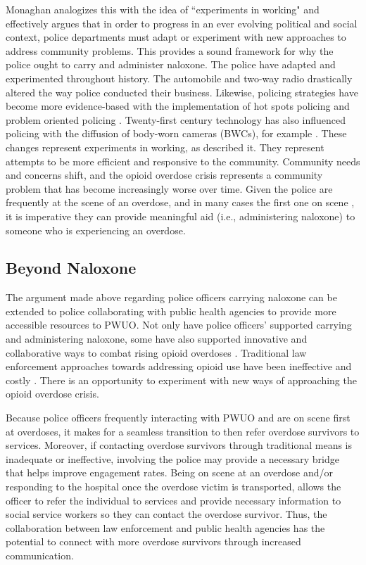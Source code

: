 Monaghan analogizes this with the idea of ``experiments in working" and effectively argues that in order to progress in an ever evolving political and social context, police departments must adapt or experiment with new approaches to address community problems. This provides a sound framework for why the police ought to carry and administer naloxone. The police have adapted and experimented throughout history. The automobile and two-way radio drastically altered the way police conducted their business. Likewise, policing strategies have become more evidence-based with the implementation of hot spots policing and problem oriented policing \parencite{braga_hot_2019, hinkle_problemoriented_2020}. Twenty-first century technology has also influenced policing with the diffusion of body-worn cameras (BWCs), for example \parencite{white_cops_2020}. These changes represent experiments in working, as \textcite{monaghan_broken_2022} described it. They represent attempts to be more efficient and responsive to the community. Community needs and concerns shift, and the opioid overdose crisis represents a community problem that has become increasingly worse over time. Given the police are frequently at the scene of an overdose, and in many cases the first one on scene \parencite{pourtaher_naloxone_2022, white_leveraging_2022}, it is imperative they can provide meaningful aid (i.e., administering naloxone) to someone who is experiencing an overdose. 

\subsection{Beyond Naloxone}

The argument made above regarding police officers carrying naloxone can be extended to police collaborating with public health agencies to provide more accessible resources to PWUO. Not only have police officers' supported carrying and administering naloxone, some have also supported innovative and collaborative ways to combat rising opioid overdoses \parencite{pourtaher_naloxone_2022, white_moving_2021}. Traditional law enforcement approaches towards addressing opioid use have been ineffective and costly \parencite{baum_smoke_1996, mitchell_criminal_2011}. There is an opportunity to experiment with new ways of approaching the opioid overdose crisis. 

Because police officers frequently interacting with PWUO and are on scene first at overdoses, it makes for a seamless transition to then refer overdose survivors to services. Moreover, if contacting overdose survivors through traditional means is inadequate or ineffective, involving the police may provide a necessary bridge that helps improve engagement rates. Being on scene at an overdose and/or responding to the hospital once the overdose victim is transported, allows the officer to refer the individual to services and provide necessary information to social service workers so they can contact the overdose survivor. Thus, the collaboration between law enforcement and public health agencies has the potential to connect with more overdose survivors through increased communication. 

